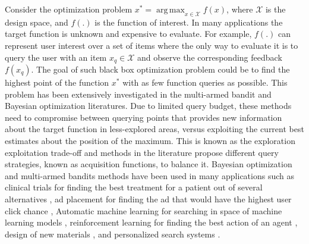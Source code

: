 \documentclass[dissertation,math,vertlayout,pdfa,colorlinks]{aaltoseries}
\DeclareMathOperator*{\argmax}{arg\,max}
\begin{document}
Consider the optimization problem $x^* = \argmax_{x \in \mathcal{X}} f(x)$, where $\mathcal{X}$ is the design space, and $f(.)$ is the function of interest. In many applications the target function is unknown and expensive to evaluate. For example, $f(.)$ can represent user interest over a set of items where the only way to evaluate it is to query the user with an item $x_q \in \mathcal{X}$ and observe the corresponding feedback $f(x_q)$. The goal of such black box optimization problem could be to find the highest point of the function $x^*$ with as few function queries as possible. This problem has been extensively investigated in the multi-armed bandit \cite{bubeck2012regret} and Bayesian optimization \cite{brochu2010tutorial,BO_review} literatures. Due to limited query budget, these methods need to compromise between querying points that provides new information about the target function in less-explored areas, versus exploiting the current best estimates about the position of the maximum. 
This is known as the exploration exploitation trade-off and methods in the literature propose different query strategies, known as acquisition functions, to balance it. Bayesian optimization and multi-armed bandits methods have been used in many applications such as clinical trials for finding the best treatment for a patient out of several alternatives \cite{bubeck2012regret}, ad placement for finding the ad that would have the highest user click chance \cite{Bandit_IR}, Automatic machine learning for searching in space of machine learning models \cite{hoffman2014correlation}, reinforcement learning for finding the best action of an agent \cite{brochu2010tutorial}, design of new materials \cite{frazier2016bayesian,BOSS2019}, and personalized search systems \cite{ruotsalo2015interactive}. 
\end{document}
